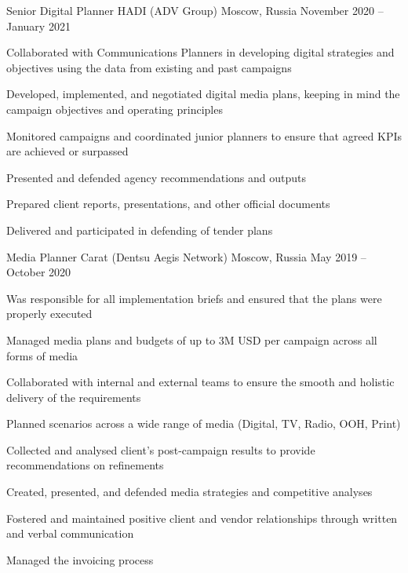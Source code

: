 \documentclass[11pt, a4paper]{awesome-cv}
\begin{document}
\begin{cventries}
\cventry
	{Senior Digital Planner}
	{HADI (ADV Group)}
	{Moscow, Russia}
	{November 2020 -- January 2021}
	{
		\begin{cvitems}
			\item {Collaborated with Communications Planners in developing digital strategies and objectives using the data from existing and past campaigns}
			\item {Developed, implemented, and negotiated digital media plans, keeping in mind the campaign objectives and operating principles}
			\item {Monitored campaigns and coordinated junior planners to ensure that agreed KPIs are achieved or surpassed}
			\item {Presented and defended agency recommendations and outputs}
			\item {Prepared client reports, presentations, and other official documents}
			\item {Delivered and participated in defending of tender plans}
		\end{cvitems}
	}

\cventry
	{Media Planner}
	{Carat (Dentsu Aegis Network)}
	{Moscow, Russia}
	{May 2019 -- October 2020}
	{
		\begin{cvitems}
			\item {Was responsible for all implementation briefs and ensured that the plans were properly executed}
			\item {Managed media plans and budgets of up to 3M USD per campaign across all forms of media}
			\item {Collaborated with internal and external teams to ensure the smooth and holistic delivery of the requirements}
			\item {Planned scenarios across a wide range of media (Digital, TV, Radio, OOH, Print)}
			\item {Collected and analysed client's post-campaign results to provide recommendations on refinements}
			\item {Created, presented, and defended media strategies and competitive analyses}
			\item {Fostered and maintained positive client and vendor relationships through written and verbal communication}
			\item {Managed the invoicing process}
		\end{cvitems}
	}
	

\end{cventries}
\end{document}
